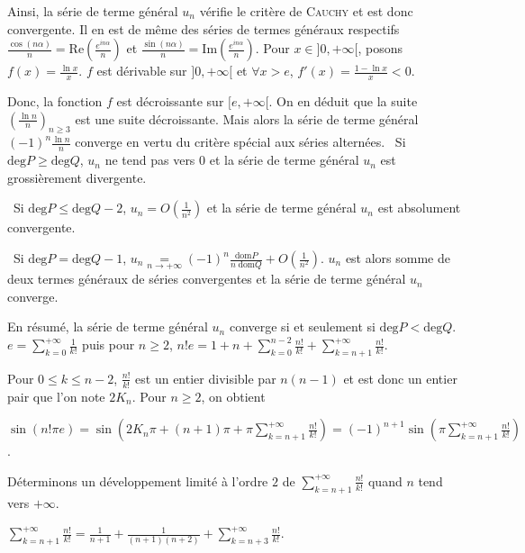 {{Ainsi, la série de terme général $u_n$ vérifie le critère de \textsc{Cauchy} et est donc convergente.
Il en est de même des séries de termes généraux respectifs  $\frac{\cos(n\alpha)}{n}=\text{Re}\left(\frac{e^{in\alpha}}{n}\right)$ et $\frac{\sin(n\alpha)}{n}=\text{Im}\left(\frac{e^{in\alpha}}{n}\right)$.
Pour $x\in]0,+\infty[$, posons $f(x)=\frac{\ln x}{x}$. $f$ est dérivable sur $]0,+\infty[$ et $\forall x>e$, $f'(x)=\frac{1-\ln x}{x}< 0$.

Donc, la fonction $f$ est décroissante sur $[e,+\infty[$. On en déduit que la suite $\left(\frac{\ln n}{n}\right)_{n\geqslant3}$ est une suite décroissante. Mais alors la série de terme général $(-1)^n\frac{\ln n}{n}$ converge en vertu du critère spécial aux séries alternées.
\textbullet~Si $\text{deg}P\geqslant\text{deg}Q$, $u_n$ ne tend pas vers $0$ et la série de terme général $u_n$ est grossièrement divergente.

\textbullet~Si $\text{deg}P\leqslant\text{deg}Q - 2$, $u_n=O\left(\frac{1}{n^2}\right)$ et la série de terme général $u_n$ est absolument convergente.

\textbullet~Si $\text{deg}P =\text{deg}Q - 1$, $u_n\underset{n\rightarrow+\infty}{=}(-1)^n\frac{\text{dom}P}{n\;\text{dom}Q}+O\left(\frac{1}{n^2}\right)$. $u_n$ est alors somme de deux termes généraux de séries convergentes et la série de terme général $u_n$ converge.

En résumé, la série de terme général $u_n$ converge si et seulement si $\text{deg}P <\text{deg}Q$.
$e=\sum_{k=0}^{+\infty}\frac{1}{k!}$  puis pour $n\geqslant2$, $n!e=1+ n+\sum_{k=0}^{n-2}\frac{n!}{k!}+\sum_{k=n+1}^{+\infty}\frac{n!}{k!}$.

Pour $0\leqslant k\leqslant n-2$, $\frac{n!}{k!}$ est un entier divisible par $n(n-1)$ et est donc un entier pair que l'on note $2K_n$. Pour $n\geqslant2$, on obtient

\begin{center}
$\sin(n!\pi e)=\sin\left(2K_n\pi+(n+1)\pi+\pi\sum_{k=n+1}^{+\infty}\frac{n!}{k!}\right)=(-1)^{n+1}\sin\left(\pi\sum_{k=n+1}^{+\infty}\frac{n!}{k!}\right)$.
\end{center}

Déterminons un développement limité à l'ordre $2$ de $\sum_{k=n+1}^{+\infty}\frac{n!}{k!}$ quand $n$ tend vers $+\infty$.

\begin{center}
$\sum_{k=n+1}^{+\infty}\frac{n!}{k!}=\frac{1}{n+1}+\frac{1}{(n+1)(n+2)}+\sum_{k=n+3}^{+\infty}\frac{n!}{k!}$.
\end{center}

}}
